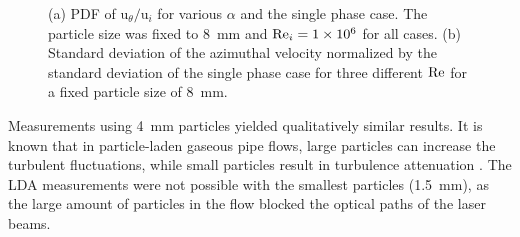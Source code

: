 \begin{figure}
\centering%
%
%
\caption{%
(a) PDF of $\text{u}_\theta / \text{u}_i$ for various $\alpha$ and the
single phase case. The particle size was fixed to \SI{8}{\milli\metre}
and $\text{Re}_i=\num{1e6}$ for all cases. (b) Standard deviation of the
azimuthal velocity normalized by the standard deviation of the single phase
case for three different $\text{Re}$ for a fixed particle size of
\SI{8}{\milli\metre}.} \label{fig:ldaresults}
\end{figure}

Measurements using \SI{4}{\milli\metre} particles yielded qualitatively
similar results. It is known that in particle-laden gaseous pipe flows, large
particles can increase the turbulent fluctuations, while small particles
result in turbulence attenuation \citep{Tsuji1984,Gore1989,Vreman2015}. The
LDA measurements were not possible with the smallest particles
(\SI{1.5}{\milli\metre}), as the large amount of particles in the flow blocked
the optical paths of the laser beams.

